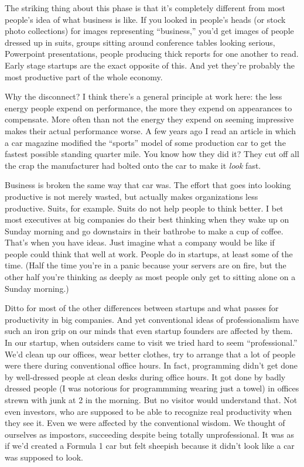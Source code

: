\documentclass[12pt]{book}
\begin{document}
The striking thing about this phase is that it's completely different
from most people's idea of what business is like. If you looked in
people's heads (or stock photo collections) for images representing
``business,'' you'd get images of people dressed up in suits, groups
sitting around conference tables looking serious, Powerpoint
presentations, people producing thick reports for one another to read.
Early stage startups are the exact opposite of this. And yet they're
probably the most productive part of the whole economy.

Why the disconnect? I think there's a general principle at work here:
the less energy people expend on performance, the more they expend on
appearances to compensate. More often than not the energy they expend on
seeming impressive makes their actual performance worse. A few years ago
I read an article in which a car magazine modified the ``sports'' model
of some production car to get the fastest possible standing quarter
mile. You know how they did it? They cut off all the crap the
manufacturer had bolted onto the car to make it \emph{look} fast.

Business is broken the same way that car was. The effort that goes into
looking productive is not merely wasted, but actually makes
organizations less productive. Suits, for example. Suits do not help
people to think better. I bet most executives at big companies do their
best thinking when they wake up on Sunday morning and go downstairs in
their bathrobe to make a cup of coffee. That's when you have ideas. Just
imagine what a company would be like if people could think that well at
work. People do in startups, at least some of the time. (Half the time
you're in a panic because your servers are on fire, but the other half
you're thinking as deeply as most people only get to sitting alone on a
Sunday morning.)

Ditto for most of the other differences between startups and what passes
for productivity in big companies. And yet conventional ideas of
professionalism have such an iron grip on our minds that even startup
founders are affected by them. In our startup, when outsiders came to
visit we tried hard to seem ``professional.'' We'd clean up our offices,
wear better clothes, try to arrange that a lot of people were there
during conventional office hours. In fact, programming didn't get done
by well-dressed people at clean desks during office hours. It got done
by badly dressed people (I was notorious for programmming wearing just a
towel) in offices strewn with junk at 2 in the morning. But no visitor
would understand that. Not even investors, who are supposed to be able
to recognize real productivity when they see it. Even we were affected
by the conventional wisdom. We thought of ourselves as impostors,
succeeding despite being totally unprofessional. It was as if we'd
created a Formula 1 car but felt sheepish because it didn't look like a
car was supposed to look.
\end{document}
